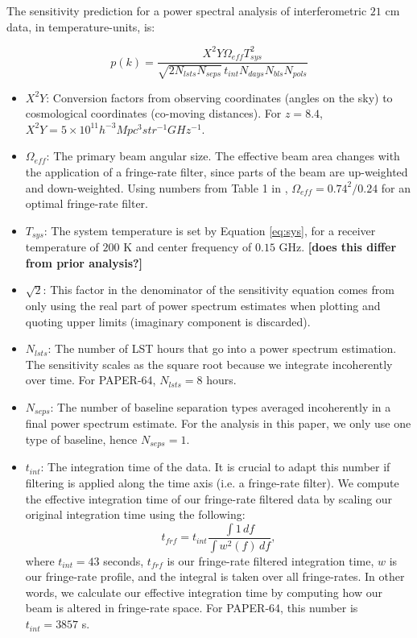 \documentclass[preprint2,numberedappendix,tighten,twocolappendix]{aastex6}  %
\newcommand{\cc}[1]{{\color{purple} \textbf{[#1]}}}
\begin{document}
The sensitivity prediction for a power spectral analysis of interferometric $21$ cm data, in temperature-units, is:

\begin{equation}
p(k) = \frac{X^{2}Y \Omega_{eff} T_{sys}^{2}}{\sqrt{2N_{lsts}N_{seps}}\,t_{int}N_{days}N_{bls}N_{pols}}
\end{equation}

\begin{itemize}
\item $X^{2}Y$: Conversion factors from observing coordinates (angles on the sky) to cosmological coordinates (co-moving distances). For $z=8.4$, $X^{2}Y = 5 \times 10^{11} h^{-3} Mpc^{3} str^{-1} GHz^{-1}$.
\item $\Omega_{eff}$: The primary beam angular size. The effective beam area changes with the application of a fringe-rate filter, since parts of the beam are up-weighted and down-weighted. Using numbers from Table 1 in \citet{parsons_et_al2016}, $\Omega_{eff} = 0.74^{2}/0.24$ for an optimal fringe-rate filter. 
\item $T_{sys}$: The system temperature is set by Equation \ref{eq:sys}, for a receiver temperature of $200$ K and center frequency of $0.15$ GHz. \cc{does this differ from prior analysis?}
\item $\sqrt{2}$: This factor in the denominator of the sensitivity equation comes from only using the real part of power spectrum estimates when plotting and quoting upper limits (imaginary component is discarded).
\item $N_{lsts}$: The number of LST hours that go into a power spectrum estimation. The sensitivity scales as the square root because we integrate incoherently over time. For PAPER-64, $N_{lsts} = 8$ hours.
\item $N_{seps}$: The number of baseline separation types averaged incoherently in a final power spectrum estimate. For the analysis in this paper, we only use one type of baseline, hence $N_{seps}=1$.
\item $t_{int}$: The integration time of the data. It is crucial to adapt this number if filtering is applied along the time axis (i.e. a fringe-rate filter). We compute the effective integration time of our fringe-rate filtered data by scaling our original integration time using the following:
\begin{equation}
t_{frf} = t_{int} \frac{\int1 \, df}{\int w^{2}(f) \,df},
\end{equation}
where $t_{int}=43$ seconds, $t_{frf}$ is our fringe-rate filtered integration time, $w$ is our fringe-rate profile, and the integral is taken over all fringe-rates. In other words, we calculate our effective integration time by computing how our beam is altered in fringe-rate space. For PAPER-64, this number is $t_{int} = 3857$ s. 

\end{itemize}
\end{document}
